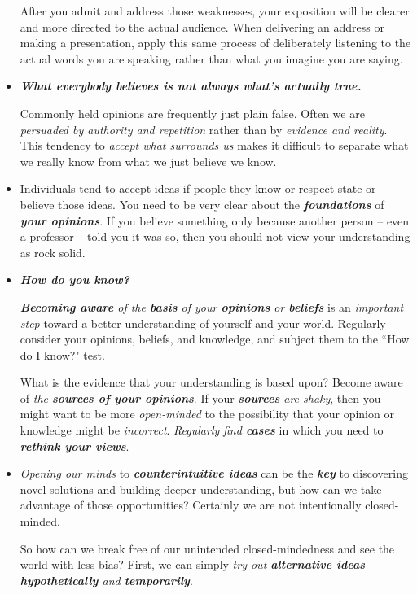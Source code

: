 \documentclass[11pt]{article}
\begin{document}
\begin{itemize}
After you admit and address those weaknesses, your exposition will be clearer and more directed to the actual audience. When delivering an address or making a presentation, apply this same process of deliberately listening to the actual words you are speaking rather than what you imagine you are saying.

\item \emph{\textbf{What everybody believes is not always what’s actually true.}}

Commonly held opinions are frequently just plain false. Often we are \emph{persuaded by authority and repetition} rather than by \emph{evidence and reality}. This tendency to \emph{accept what surrounds us} makes it difficult to separate what we really know from what we just believe we know. 

\item Individuals tend to accept ideas if people they know or respect state or believe those ideas. You need to be very clear about the \emph{\textbf{foundations}} of \emph{\textbf{your opinions}}. If you believe something only because another person -- even a professor -- told you it was so, then you should not view your understanding as rock solid. 

\item \emph{\textbf{How do you know?}}

\emph{\textbf{Becoming aware} of the \textbf{basis} of your \textbf{opinions} or \textbf{beliefs}} is an \emph{important step} toward a better understanding of yourself and your world. Regularly consider your opinions, beliefs, and knowledge, and subject them to the ``How do I know?" test.

What is the evidence that your understanding is based upon? Become aware of \emph{the \textbf{sources of your opinions}}. If your \emph{\textbf{sources} are shaky}, then you might want to be more \emph{open-minded} to the possibility that your opinion or knowledge might be \emph{incorrect}. \emph{Regularly} \emph{find \textbf{cases}} in which you need to \emph{\textbf{rethink your views}}.

\item \emph{Opening our minds} to \emph{\textbf{counterintuitive ideas}} can be the \emph{\textbf{key}} to discovering novel solutions and building deeper understanding, but how can we take advantage of those opportunities? Certainly we are not intentionally closed-minded. 

So how can we break free of our unintended closed-mindedness and see the world with less bias? First, we can simply \emph{try out \textbf{alternative ideas} \textbf{hypothetically} and \textbf{temporarily}}. 


\end{itemize}
\end{document}
